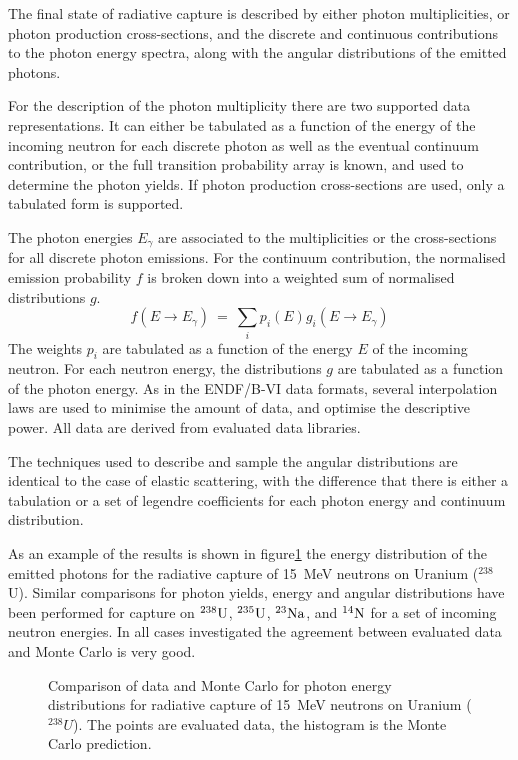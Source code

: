 The final state of radiative capture is described by either photon 
multiplicities, or photon production cross-sections, and the discrete and 
continuous contributions to the photon energy spectra, along with the angular 
distributions of the emitted photons.

For the description of the photon multiplicity there are two supported data
representations.
It can either be tabulated as a function of the energy of
the incoming neutron for each discrete photon as well as the eventual
continuum contribution, or the full transition probability array is known, and
used to determine the photon yields. If photon production cross-sections are
used, only a tabulated form is supported.

The photon energies $E_\gamma$ are associated to the multiplicities or the
cross-sections for
all discrete photon emissions. For the continuum contribution, the normalised
emission probability $f$ is broken down into a weighted 
sum of normalised distributions $g$.
$$f\left(E\rightarrow E_\gamma\right)~=~
\sum_{i}p_i(E)g_i(E\rightarrow E_\gamma)$$
The weights $p_i$ are tabulated as a function of the energy $E$
of the incoming neutron. 
For each neutron energy, the distributions $g$ are tabulated as a function 
of the photon energy. As in the ENDF/B-VI data formats\cite{ENDF}, several 
interpolation laws are used to minimise the amount of data, and optimise
the descriptive power. All data are derived from evaluated data libraries.

The techniques used to describe and sample the angular distributions are 
identical to the case of elastic scattering, with the difference that there 
is either a tabulation or a set of legendre coefficients for each photon 
energy and continuum distribution.

As an example of the results is shown in figure\ref{capture} the energy
distribution of the emitted photons for the radiative
capture of 15~MeV neutrons on Uranium ($^{238}$U). 
Similar comparisons for photon yields, energy and angular distributions have
been performed for capture on
${\rm^{238}U}$, 
${\rm^{235}U}$, 
${\rm^{23}Na}$, and 
${\rm^{14}N}$
for a set of incoming neutron energies.
In all cases investigated
the agreement between evaluated data and Monte Carlo is very good.

\begin{figure}[b!] %
\centerline{}
\vspace{10pt}
\caption{Comparison of data and Monte Carlo for photon energy
distributions for radiative capture of 15~MeV neutrons on Uranium ($^{238}U$). 
The points are evaluated data, the histogram is
the Monte Carlo prediction.}
\label{capture}
\end{figure}
